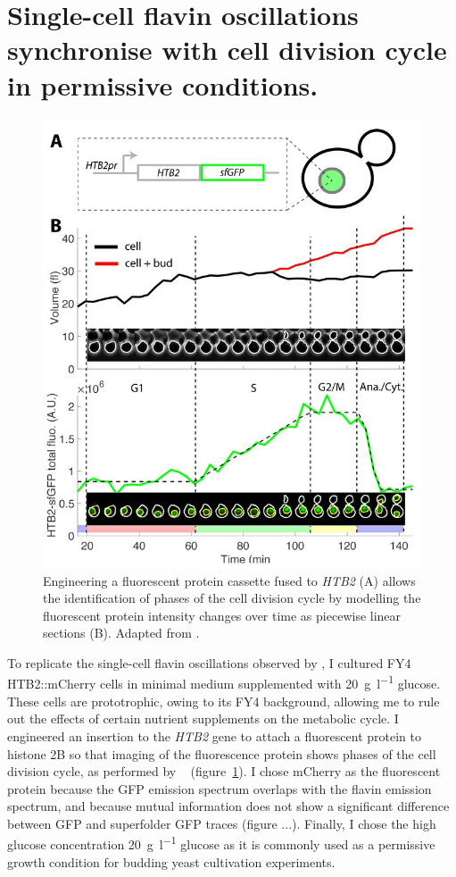 \section[Permissive conditions]{Single-cell flavin oscillations synchronise with cell division cycle in permissive conditions.}
\label{sec:biology-sync}

\begin{figure}
  \centering
    \includegraphics[width=0.5\linewidth]{garmendia-torresMultipleInputsEnsure2018_1_adapted.jpg}
    \caption{
      Engineering a fluorescent protein cassette fused to \textit{HTB2} (A) allows the identification of phases of the cell division cycle by modelling the fluorescent protein intensity changes over time as piecewise linear sections (B).
      Adapted from \textcite{garmendia-torresMultipleInputsEnsure2018}.
    }
  \label{fig:biology-htb2}
\end{figure}

To replicate the single-cell flavin oscillations observed by \textcite{baumgartnerFlavinbasedMetabolicCycles2018}, I cultured FY4 HTB2::mCherry cells in minimal medium supplemented with \SI{20}{\gram~\litre^{-1}} glucose.
These cells are prototrophic, owing to its FY4 background, allowing me to rule out the effects of certain nutrient supplements on the metabolic cycle.
I engineered an insertion to the \textit{HTB2} gene to attach a fluorescent protein to histone 2B so that imaging of the fluorescence protein shows phases of the cell division cycle, as performed by ~\textcite{garmendia-torresMultipleInputsEnsure2018} (figure~\ref{fig:biology-htb2}).
I chose mCherry as the fluorescent protein because the GFP emission spectrum overlaps with the flavin emission spectrum, and because mutual information does not show a significant difference between GFP and superfolder GFP traces (figure ...).
Finally, I chose the high glucose concentration \SI{20}{\gram~\litre^{-1}} glucose as it is commonly used as a permissive growth condition for budding yeast cultivation experiments.

